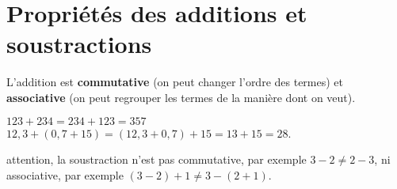 \section{Propriétés des additions et soustractions} %

\begin{propriete}
   L'addition est {\bf commutative} (on peut changer l’ordre des termes) et {\bf associative} (on peut regrouper les termes de la manière dont on veut).
\end{propriete}

\begin{exemple*1}
   $123+234 =234+123 =357$ \\
      $12,3+(0,7+15) =(12,3+0,7)+15 =13+15 =28$.
\end{exemple*1}

\begin{remarque}
   attention, la soustraction n'est pas commutative, par exemple $3-2 \neq2-3$, ni associative, par exemple $(3-2)+1 \neq3-(2+1)$.
\end{remarque}
